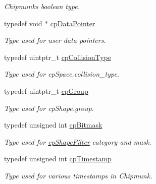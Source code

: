 \begin{DoxyCompactItemize}
\begin{DoxyCompactList}\small\item\em Chipmunk\textquotesingle{}s boolean type. \end{DoxyCompactList}\item 
\mbox{\label{group__basicTypes_ga2ac2c3c31e21893941f9e4f8ee279447}} 
typedef void $\ast$ \hyperlink{group__basicTypes_ga2ac2c3c31e21893941f9e4f8ee279447}{cp\+Data\+Pointer}
\begin{DoxyCompactList}\small\item\em Type used for user data pointers. \end{DoxyCompactList}\item 
\mbox{\label{group__basicTypes_gae83e2f50965eb441e36ffff1e32e6d02}} 
typedef uintptr\+\_\+t \hyperlink{group__basicTypes_gae83e2f50965eb441e36ffff1e32e6d02}{cp\+Collision\+Type}
\begin{DoxyCompactList}\small\item\em Type used for cp\+Space.\+collision\+\_\+type. \end{DoxyCompactList}\item 
\mbox{\label{group__basicTypes_gacd811b1135a8f4a3e5cc019552b18b1a}} 
typedef uintptr\+\_\+t \hyperlink{group__basicTypes_gacd811b1135a8f4a3e5cc019552b18b1a}{cp\+Group}
\begin{DoxyCompactList}\small\item\em Type used for cp\+Shape.\+group. \end{DoxyCompactList}\item 
\mbox{\label{group__basicTypes_gae7ff94f62e00cae288c1991958822743}} 
typedef unsigned int \hyperlink{group__basicTypes_gae7ff94f62e00cae288c1991958822743}{cp\+Bitmask}
\begin{DoxyCompactList}\small\item\em Type used for \hyperlink{structcpShapeFilter}{cp\+Shape\+Filter} category and mask. \end{DoxyCompactList}\item 
\mbox{\label{group__basicTypes_gaa24652c104082d0725066ea5ac7dc83f}} 
typedef unsigned int \hyperlink{group__basicTypes_gaa24652c104082d0725066ea5ac7dc83f}{cp\+Timestamp}
\begin{DoxyCompactList}\small\item\em Type used for various timestamps in Chipmunk. \end{DoxyCompactList}\end{DoxyCompactItemize}


